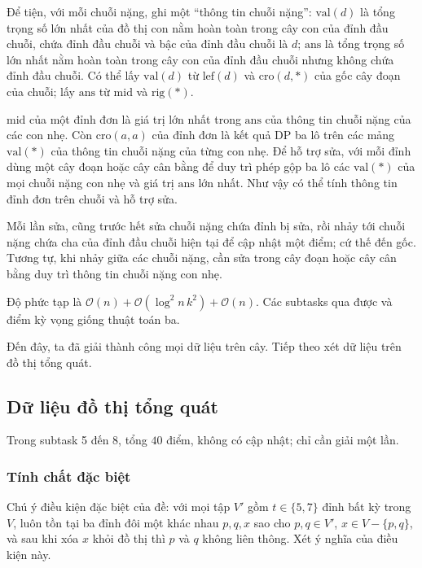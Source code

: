 \documentclass[11pt]{article}
\newcommand{\Oh}{\mathcal{O}}
\begin{document}
Để tiện, với mỗi chuỗi nặng, ghi một ``thông tin chuỗi nặng'':
\(\mathrm{val}(d)\) là tổng trọng số lớn nhất của đồ thị con nằm hoàn toàn
trong cây con của đỉnh đầu chuỗi, chứa đỉnh đầu chuỗi và bậc của đỉnh đầu
chuỗi là \(d\); \(\mathrm{ans}\) là tổng trọng số lớn nhất nằm hoàn toàn trong
cây con của đỉnh đầu chuỗi nhưng không chứa đỉnh đầu chuỗi. Có thể lấy
\(\mathrm{val}(d)\) từ \(\mathrm{lef}(d)\) và \(\mathrm{cro}(d,*)\) của gốc cây
đoạn của chuỗi; lấy \(\mathrm{ans}\) từ \(\mathrm{mid}\) và
\(\mathrm{rig}(*)\).

\(\mathrm{mid}\) của một đỉnh đơn là giá trị lớn nhất trong \(\mathrm{ans}\)
của thông tin chuỗi nặng của các con nhẹ. Còn \(\mathrm{cro}(a,a)\) của đỉnh
đơn là kết quả DP ba lô trên các mảng \(\mathrm{val}(*)\) của thông tin chuỗi
nặng của từng con nhẹ. Để hỗ trợ sửa, với mỗi đỉnh dùng một cây đoạn hoặc cây
cân bằng để duy trì phép gộp ba lô các \(\mathrm{val}(*)\) của mọi chuỗi nặng
con nhẹ và giá trị \(\mathrm{ans}\) lớn nhất. Như vậy có thể tính thông tin
đỉnh đơn trên chuỗi và hỗ trợ sửa.

Mỗi lần sửa, cũng trước hết sửa chuỗi nặng chứa đỉnh bị sửa, rồi nhảy tới
chuỗi nặng chứa cha của đỉnh đầu chuỗi hiện tại để cập nhật một điểm; cứ thế
đến gốc. Tương tự, khi nhảy giữa các chuỗi nặng, cần sửa trong cây đoạn hoặc
cây cân bằng duy trì thông tin chuỗi nặng con nhẹ.

Độ phức tạp là \(\Oh(n)+\Oh(\log^2 n\,k^2)+\Oh(n)\). Các subtasks qua được và
điểm kỳ vọng giống thuật toán ba.

Đến đây, ta đã giải thành công mọi dữ liệu trên cây. Tiếp theo xét dữ liệu
trên đồ thị tổng quát.

\subsection{Dữ liệu đồ thị tổng quát}

Trong subtask 5 đến 8, tổng \(40\) điểm, không có cập nhật; chỉ cần giải một
lần.

\subsubsection{Tính chất đặc biệt}

Chú ý điều kiện đặc biệt của đề: với mọi tập \(V'\) gồm \(t\in\{5,7\}\) đỉnh
bất kỳ trong \(V\), luôn tồn tại ba đỉnh đôi một khác nhau \(p,q,x\) sao cho
\(p,q\in V'\), \(x\in V-\{p,q\}\), và sau khi xóa \(x\) khỏi đồ thị thì \(p\)
và \(q\) không liên thông. Xét ý nghĩa của điều kiện này.
\end{document}
